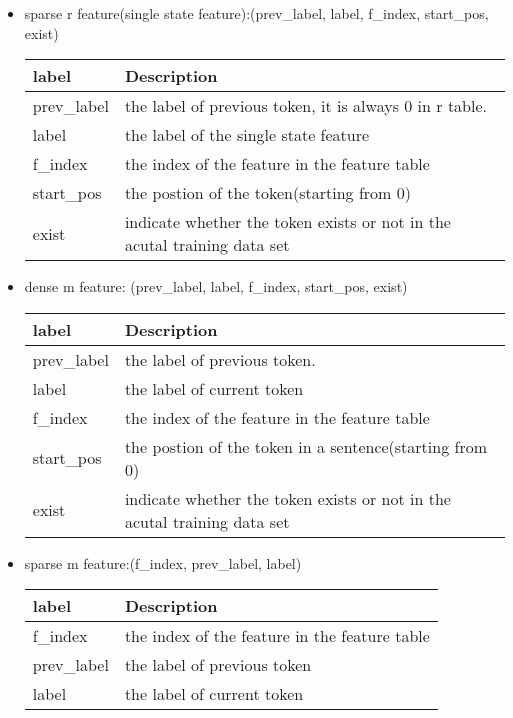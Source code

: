 \begin{itemize}

\item
sparse r feature(single state feature):(prev\_label, label, f\_index, start\_pos, exist)

\begin{center}
    \begin{tabular}{ | l | l |}
    \hline
    label & Description \\ \hline
    prev\_label & the label of previous token, it is always 0 in r table.\\
    label       & the label of the single state feature\\
    f\_index    & the index of the feature in the feature table\\
    start\_pos  & the postion of the token(starting from 0)\\
    exist       & indicate whether the token exists or not in the acutal training data set\\
    \hline
    \end{tabular}
\end{center}

\item
dense m feature:
(prev\_label, label, f\_index, start\_pos, exist)
\begin{center}
    \begin{tabular}{ | l | l |}
    \hline
    label & Description \\ \hline
    prev\_label & the label of previous token.\\
    label       & the label of current token\\
    f\_index    & the index of the feature in the feature table\\
    start\_pos  & the postion of the token in a sentence(starting from 0)\\
    exist       & indicate whether the token exists or not in the acutal training data set\\
    \hline
    \end{tabular}
\end{center}

\item
sparse m feature:(f\_index, prev\_label, label)
\begin{center}
    \begin{tabular}{ | l | l |}
    \hline
    label & Description \\ \hline
    f\_index    &  the index of the feature in the feature table\\
    prev\_label &  the label of previous token \\
    label       &  the label of current token\\
    \hline
    \end{tabular}
\end{center}

\end{itemize}

